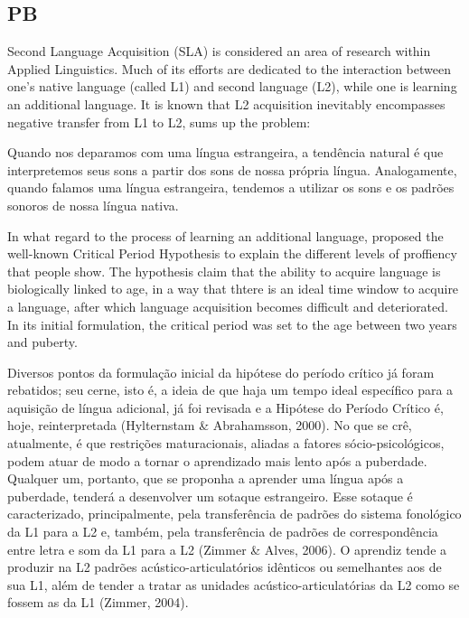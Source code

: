 \subsection{PB}

Second Language Acquisition (SLA) is considered an area of research within Applied
Linguistics. Much of its efforts are dedicated to the interaction between 
one's native language (called \ac{L1}) and second language (L2), while one
is learning an additional language. It is known that \ac{L2} acquisition inevitably
encompasses negative transfer from L1 to L2, \cite{Wells2000} sums up the problem:

Quando nos deparamos com uma l\'ingua estrangeira, a tend\^encia natural \'e
que interpretemos seus sons a partir dos sons de nossa pr\'opria l\'ingua.
Analogamente, quando falamos uma l\'ingua estrangeira, tendemos a utilizar
os sons e os padr\~oes sonoros de nossa l\'ingua nativa.

In what regard to the process of learning an additional language, \cite{Lenneberg1967}
proposed the well-known Critical Period Hypothesis to explain the different levels
of proffiency that people show. The hypothesis claim that the ability to acquire 
language is biologically linked to age, in a way that thtere is an ideal time window
to acquire a language, after which language acquisition becomes difficult and deteriorated.
In its initial formulation, the critical period was set to the age between two years and puberty.

Diversos pontos da formula\c{c}\~ao inicial da hip\'otese do per\'iodo cr\'itico j\'a
foram rebatidos; seu cerne, isto \'e, a ideia de que haja um tempo ideal
espec\'ifico para a aquisi\c{c}\~ao de l\'ingua adicional, j\'a foi revisada e a
Hip\'otese do Per\'iodo Cr\'itico \'e, hoje, reinterpretada (Hylternstam \&
Abrahamsson, 2000). No que se cr\^e, atualmente, \'e que restri\c{c}\~oes
maturacionais, aliadas a fatores s\'ocio-psicol\'ogicos, podem atuar de modo
a tornar o aprendizado mais lento ap\'os a puberdade. Qualquer um,
portanto, que se proponha a aprender uma l\'ingua ap\'os a puberdade,
tender\'a a desenvolver um sotaque estrangeiro. Esse sotaque \'e
caracterizado, principalmente, pela transfer\^encia de padr\~oes do sistema
fonol\'ogico da L1 para a L2 e, tamb\'em, pela transfer\^encia de padr\~oes de
correspond\^encia entre letra e som da L1 para a L2 (Zimmer \& Alves,
2006). O aprendiz tende a produzir na L2 padr\~oes ac\'ustico-articulat\'orios
id\^enticos ou semelhantes aos de sua L1, al\'em de tender a tratar as
unidades ac\'ustico-articulat\'orias da L2 como se fossem as da L1 (Zimmer,
2004).

